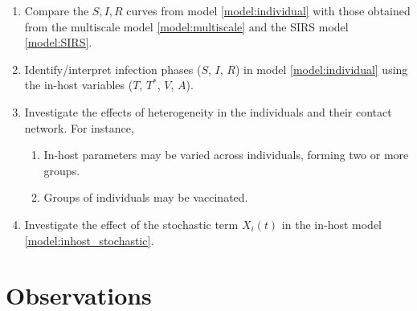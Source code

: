 \documentclass[11pt]{article}
\numberwithin{equation}{subsection}
\begin{document}
    \begin{enumerate}
        \item Compare the $S, I, R$ curves from model \ref{model:individual}
        with those obtained from the multiscale model \ref{model:multiscale}
        and the SIRS model \ref{model:SIRS}.

        \item Identify/interpret infection phases ($S$, $I$, $R$) in model
        \ref{model:individual} using the in-host variables ($T$, $T^*$, $V$,
        $A$).

        \item Investigate the effects of heterogeneity in the individuals and
        their contact network. For instance,
        \begin{enumerate}
            \item In-host parameters may be varied across individuals, forming
            two or more groups.
            \item Groups of individuals may be vaccinated.
        \end{enumerate}

        \item Investigate the effect of the stochastic term $X_i(t)$ in the
        in-host model \ref{model:inhost_stochastic}.
    \end{enumerate}


    \section{Observations}
\end{document}
